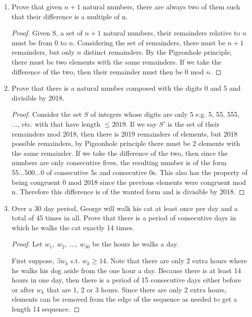 \documentclass{article}
\begin{document}
\thispagestyle{fancy}
\begin{enumerate}
\item Prove that given $n+1$ natural numbers, there are always two of them such that their difference is a multiple of n.

\begin{proof}
    Given S, a set of $n+1$ natural numbers, their remainders relative to $n$ must be from 0 to $n$. Considering the set of remainders, there must be $n+1$ remainders, but only $n$ distinct remainders. By the Pigeonhole principle,  there must be two elements with the same remainders. If we take the difference of the two, then their remainder must then be 0 mod $n$.
\end{proof}


\item Prove that there is a natural number composed with the digits 0 and 5 and divisible by 2018.
\begin{proof}
    Consider the set $S$ of integers whose digits are only 5 e.g. 5, 55, 555, ..., etc. with that have length $\leq 2019$. If we say $S'$ is the set of their remainders mod 2018, then there is 2019 remainders of elements, but 2018 possible remainders, by Pigeonhole principle there must be 2 elements with the same remainder. If we take the difference of the two, then since the numbers are only consecutive fives, the resulting number is of the form 55...500...0 of consecutive 5s and consecutive 0s. This also has the property of being congruent 0 mod 2018 since the previous elements were congruent mod n. Therefore this difference is of the wanted form and is divisible by 2018.
\end{proof}
\item Over a 30 day period, George will walk his cat at least once per day and a total of 45 times in all. Prove that there is a period of consecutive days in which he walks the cat exactly 14 times.

\begin{proof}
Let $w_1, \ w_2, \ \dots, \ w_{30}$ be the hours he walks a day. 

First suppose, $\exists w_k$ s.t. $w_k \geq 14$. Note that there are only 2 extra hours where he walks his dog aside from the one hour a day. Because there is at least 14 hours in one day, then there is a period of 15 consecutive days either before or after $w_k$ that are 1, 2 or 3 hours. Since there are only 2 extra hours, elements can be removed from the edge of the sequence as needed to get a length 14 sequence.


\end{proof}
\end{enumerate}
\end{document}
